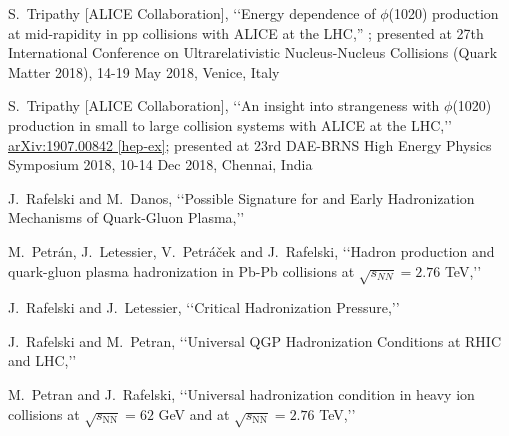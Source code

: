 \begin{thebibliography}{100}
  S.~Tripathy [ALICE Collaboration],
\lq\lq Energy dependence of $\phi$(1020) production at mid-rapidity in pp collisions with ALICE at the LHC,''
 ; presented at 
27th International Conference on Ultrarelativistic Nucleus-Nucleus Collisions (Quark Matter 2018), 14-19 May 2018, Venice, Italy
 

  S.~Tripathy [ALICE Collaboration],
\lq\lq An insight into strangeness with $\phi$(1020) production in small to large collision systems with ALICE at the LHC,\rq\rq
\href{https://arxiv.org/pdf/1907.00842.pdf}{arXiv:1907.00842 [hep-ex]};  presented at 23rd DAE-BRNS High Energy Physics Symposium 2018, 10-14 Dec 2018, Chennai, India
 
  J.~Rafelski and M.~Danos,
\lq\lq Possible Signature for and Early Hadronization Mechanisms of Quark-Gluon Plasma,\rq\rq\
  
 

  M.~Petrán, J.~Letessier, V.~Petráček and J.~Rafelski,
\lq\lq Hadron production and quark-gluon plasma hadronization in Pb-Pb collisions at $\sqrt{s_{NN}}=2.76$ TeV,\rq\rq\


  J.~Rafelski and J.~Letessier,
\lq\lq Critical Hadronization Pressure,\rq\rq\

\bibitem{Rafelski:2014cqa} 
  J.~Rafelski and M.~Petran,
\lq\lq Universal QGP Hadronization Conditions at RHIC and LHC,\rq\rq\
  


  M.~Petran and J.~Rafelski,
\lq\lq Universal hadronization condition in heavy ion collisions at $\sqrt{s_\mathrm{NN}}= 62$ GeV and at $\sqrt{s_\mathrm{NN}}=2.76$ TeV,\rq\rq\



\end{thebibliography}
